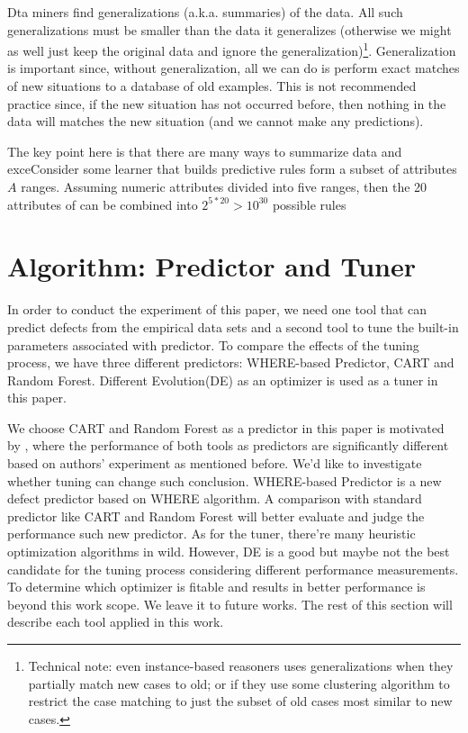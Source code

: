 Dta miners find generalizations (a.k.a. summaries)
of the data. All such generalizations must be smaller than the data it generalizes (otherwise we might as well just keep the original data and ignore the generalization)\footnote{Technical note:
even instance-based reasoners uses generalizations when they partially match new cases to old;
or if they use some  clustering algorithm to restrict the case matching
to just the subset of old cases most similar  to new  cases.}. 
Generalization is important since,
without generalization, all we can do is perform exact matches
of new situations to a database of old examples. This is not recommended practice since,
 if the new situation has not occurred  before, then nothing in the data  will
 matches the new situation
(and we cannot make any predictions).

The key point here is that there are many ways to summarize data and exceConsider some learner that
builds predictive rules form a subset of  attributes $A$ ranges. Assuming numeric attributes
divided into five ranges, then the 20 attributes of  can be combined into 
$2^{5*20}> 10^{30}$
possible rules 

\section{Algorithm: Predictor and Tuner}

In order to conduct the experiment of this paper, we need one tool that can predict defects 
from the empirical data sets and a second tool to tune the built-in parameters associated with 
predictor. To compare the effects of the tuning process, we have three different predictors: 
WHERE-based Predictor, CART and Random Forest. Different Evolution(DE) as an optimizer 
is used as a tuner in this paper.

We choose CART and Random Forest as a predictor in this paper is motivated by 
\cite{lessmann2008benchmarking}, where the performance of both tools as predictors are 
significantly different based on authors' experiment as mentioned before. We'd like to 
investigate whether tuning can change such conclusion. WHERE-based Predictor is a new 
defect predictor based on WHERE\cite{menzies2013local} algorithm. A comparison with 
standard predictor like CART and Random Forest will better evaluate and judge the 
performance such new predictor. As for the tuner, there're many heuristic optimization 
algorithms in wild. However, DE is a good but maybe not the best candidate for the tuning 
process considering different performance measurements. To determine which optimizer is 
fitable and results in better performance is beyond this work scope. We leave it to future 
works. The rest of this section will describe each tool applied in this work.


